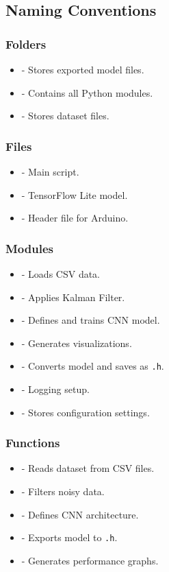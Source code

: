 \subsection{Naming Conventions}
\subsubsection{Folders}
\begin{itemize}
	\item {} - Stores exported model files.
	\item {} - Contains all Python modules.
	\item {} - Stores dataset files.
\end{itemize}

\subsubsection{Files}
\begin{itemize}
	\item {} - Main script.
	\item {} - TensorFlow Lite model.
	\item {} - Header file for Arduino.
\end{itemize}

\subsubsection{Modules}
\begin{itemize}
	\item {} - Loads CSV data.
	\item {} - Applies Kalman Filter.
	\item {} - Defines and trains CNN model.
	\item {} - Generates visualizations.
	\item {} - Converts model and saves as \texttt{.h}.
	\item {} - Logging setup.
	\item {} - Stores configuration settings.
\end{itemize}

\subsubsection{Functions}
\begin{itemize}
	\item {} - Reads dataset from CSV files.
	\item {} - Filters noisy data.
	\item {} - Defines CNN architecture.
	\item {} - Exports model to \texttt{.h}.
	\item {} - Generates performance graphs.
\end{itemize}

